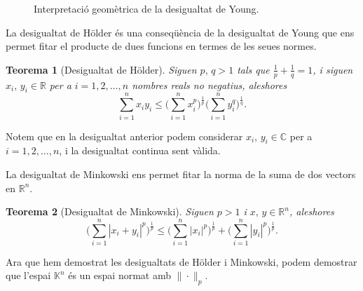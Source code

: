 \documentclass[12pt]{book}
\newtheorem{teorema}{Teorema}[chapter]
\theoremstyle{definition}
\theoremstyle{nota}
\theoremstyle{exemple}
\begin{document}
\begin{figure}[htbp]
  \centering
  \caption{Interpretació geomètrica de la desigualtat de Young.}
  \label{fig:young}
\end{figure}

La desigualtat de Hölder és una conseqüència de la desigualtat de
Young que ens permet fitar el producte de dues funcions en termes de
les seues normes.

\begin{teorema}[Desigualtat de Hölder]
  Siguen $p,\, q > 1$ tals que $\frac{1}{p} + \frac{1}{q} = 1$, i
  siguen $x_i,\, y_i \in \mathbb{R}$ per a $i = 1, 2, \dotsc, n$
  nombres reals no negatius, aleshores
  \[
    \sum_{i=1}^{n} x_i y_i \leq
    \Big( \sum_{i=1}^{n} x_i^p \Big)^{\frac{1}{p}}
    \Big( \sum_{i=1}^{n} y_i^q \Big)^{\frac{1}{q}}.
  \]
\end{teorema}

Notem que en la desigualtat anterior podem considerar
$x_i, \, y_i \in \mathbb{C}$ per a $i = 1, 2, \dotsc, n$, i la
desigualtat continua sent vàlida.

La desigualtat de Minkowski ens permet fitar la norma de la suma de
dos vectors en $\mathbb{R}^n$.

\begin{teorema}[Desigualtat de Minkowski]
  Siguen $p > 1$ i $x,\, y \in \mathbb{R}^n$, aleshores
  \[
    \Big( \sum_{i=1}^{n} |x_i + y_i|^p \Big)^{\frac{1}{p}} \leq
    \Big( \sum_{i=1}^{n} |x_i|^p \Big)^{\frac{1}{p}} +
    \Big( \sum_{i=1}^{n} |y_i|^p \Big)^{\frac{1}{p}}.
  \]
\end{teorema}

Ara que hem demostrat les desigualtats de Hölder i Minkowski, podem
demostrar que l'espai $\mathbb{K}^n$ és un espai normat amb
$\|\cdot\|_p$.
\end{document}
